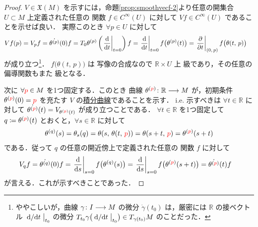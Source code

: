 \documentclass[TQFT_main]{subfiles}
\begin{document}
\begin{proof}
    $V \in \mathfrak{X}(M)$ を示すには，命題\ref{prop:smoothvecf-2}より任意の開集合 $U \subset M$ 上定義された任意の \cinfty 関数 $f \in C^\infty (U)$ に対して $V f \in C^\infty (U)$ であることを示せば良い．
    実際このとき $\forall p \in U$ に対して
    \begin{align}
        Vf (p) &= V_p f = \dot{\theta^{(p)}} (0) f 
        = T_0 \theta^{(p)} \left( \eval{\dv{}{t}}_{t=0} \right) f
        = \eval{\dv{}{t}}_{t=0} f \bigl( \theta^{(p)} (t) \bigr) = \eval{\pdv{}{t}}_{(0,\, p)} f \bigl( \theta(t,\, p) \bigr) 
    \end{align}
    が成り立つ\footnote{ややこしいが，\cinfty 曲線 $\gamma \colon I \longrightarrow M$ の微分 $\dot{\gamma} (t_0)$ は，厳密には $\mathbb{R}$ の接ベクトル $\eval{\dv*{}{t}}_{t_0}$ の微分 $T_{t_0} \gamma \bigl( \eval{\dv*{}{t}}_{t_0} \bigr) \in T_{\gamma(t_0)} M$ のことだった．}．
    $f \bigl( \theta(t,\, p) \bigr) $ は \cinfty 写像の合成なので $\mathbb{R} \times U$ 上 \cinfty 級であり，その任意の偏導関数もまた \cinfty 級となる．

    次に $\forall \textcolor{red}{p}\in M$ を1つ固定する．このとき \cinfty 曲線 $\theta^{(\textcolor{red}{p})} \colon \mathbb{R} \longrightarrow M$ が，初期条件 $\theta^{(\textcolor{red}{p})} (0) = \textcolor{red}{p}$ を充たす $V$ の\hyperref[def:integral-curve]{積分曲線}であることを示す．
    i.e. 示すべきは $\forall t \in \mathbb{R}$ に対して $\dot{\theta^{(\textcolor{red}{p})}} (t) = V_{\theta^{(\textcolor{red}{p})}(t)}$ が成り立つことである．
    $\forall t \in \mathbb{R}$ を1つ固定して $q \coloneqq \theta^{(\textcolor{red}{p})} (t)$ とおくと，$\forall s \in \mathbb{R}$ に対して
    \begin{align}
        \theta^{(q)} (s) = \theta_{s}(q) = \theta (s,\, \theta(t,\, \textcolor{red}{p})) = \theta (s + t,\, \textcolor{red}{p}) = \theta^{(\textcolor{red}{p})} (s + t)
    \end{align}
    である．従って $q$ の任意の開近傍上で定義された任意の \cinfty 関数 $f$ に対して
    \begin{align}
        V_q f &= \dot{\theta^{(q)}} (0) f = \eval{\dv{}{s}}_{s=0} f \bigl( \theta^{(q)} (s) \bigr) = \eval{\dv{}{s}}_{s=0} f \bigl( \theta^{(\textcolor{red}{p})} (s + t) \bigr) = \dot{\theta^{(\textcolor{red}{p})}} (t) f
    \end{align}
    が言える．これが示すべきことであった．
\end{proof}
\end{document}
